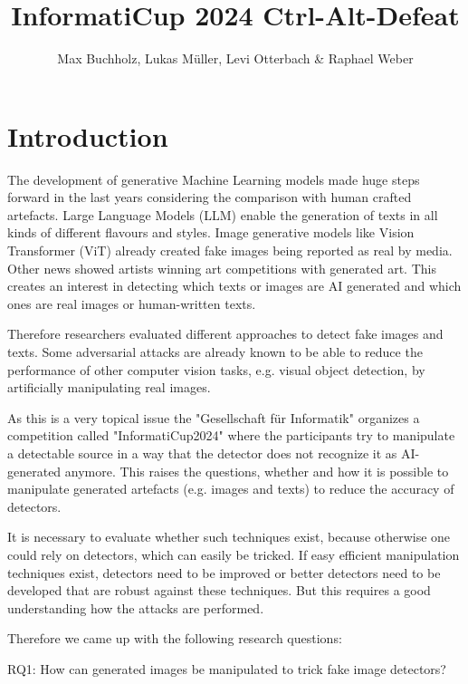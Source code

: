 \documentclass{article} %
\title{InformatiCup 2024 Ctrl-Alt-Defeat}
\author{Max Buchholz, Lukas Müller, Levi Otterbach \& Raphael Weber}
\begin{document}
\maketitle

\begin{abstract}

\end{abstract}

\section{Introduction}
The development of generative Machine Learning models made huge steps forward in the last years considering the comparison with human crafted artefacts. Large Language Models (LLM) enable the generation of texts in all kinds of different flavours and styles. Image generative models like Vision Transformer (ViT) already created fake images being reported as real by media. Other news showed artists winning art competitions with generated art. This creates an interest in detecting which texts or images are AI generated and which ones are real images or human-written texts.

Therefore researchers evaluated different approaches to detect fake images and texts. Some adversarial attacks are already known to be able to reduce the performance of other computer vision tasks, e.g. visual object detection, by artificially manipulating real images.

As this is a very topical issue the "Gesellschaft für Informatik" \cite{GI} organizes a competition called "InformatiCup2024" \cite{InformatiCup} where the participants try to manipulate a detectable source in a way that the detector does not recognize it as AI-generated anymore. This raises the questions, whether and how it is possible to manipulate generated artefacts (e.g. images and texts) to reduce the accuracy of detectors.

It is necessary to evaluate whether such techniques exist, because otherwise one could rely on detectors, which can easily be tricked. If easy efficient manipulation techniques exist, detectors need to be improved or better detectors need to be developed that are robust against these techniques. But this requires a good understanding how the attacks are performed.

Therefore we came up with the following research questions:


RQ1: How can generated images be manipulated to trick fake image detectors?
\end{document}
